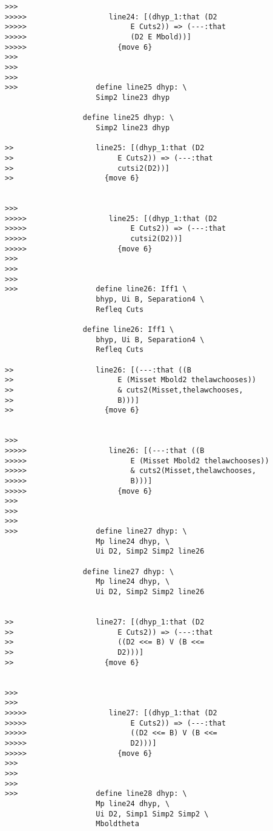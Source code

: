 \documentclass[12pt]{article}
\begin{document}
\begin{verbatim}
>>>
>>>>>                   line24: [(dhyp_1:that (D2
>>>>>                        E Cuts2)) => (---:that
>>>>>                        (D2 E Mbold))]
>>>>>                     {move 6}
>>>
>>>
>>>
>>>                  define line25 dhyp: \
                     Simp2 line23 dhyp

                  define line25 dhyp: \
                     Simp2 line23 dhyp

>>                   line25: [(dhyp_1:that (D2
>>                        E Cuts2)) => (---:that
>>                        cutsi2(D2))]
>>                     {move 6}


>>>
>>>>>                   line25: [(dhyp_1:that (D2
>>>>>                        E Cuts2)) => (---:that
>>>>>                        cutsi2(D2))]
>>>>>                     {move 6}
>>>
>>>
>>>
>>>                  define line26: Iff1 \
                     bhyp, Ui B, Separation4 \
                     Refleq Cuts

                  define line26: Iff1 \
                     bhyp, Ui B, Separation4 \
                     Refleq Cuts

>>                   line26: [(---:that ((B
>>                        E (Misset Mbold2 thelawchooses))
>>                        & cuts2(Misset,thelawchooses,
>>                        B)))]
>>                     {move 6}


>>>
>>>>>                   line26: [(---:that ((B
>>>>>                        E (Misset Mbold2 thelawchooses))
>>>>>                        & cuts2(Misset,thelawchooses,
>>>>>                        B)))]
>>>>>                     {move 6}
>>>
>>>
>>>
>>>                  define line27 dhyp: \
                     Mp line24 dhyp, \
                     Ui D2, Simp2 Simp2 line26

                  define line27 dhyp: \
                     Mp line24 dhyp, \
                     Ui D2, Simp2 Simp2 line26


>>                   line27: [(dhyp_1:that (D2
>>                        E Cuts2)) => (---:that
>>                        ((D2 <<= B) V (B <<=
>>                        D2)))]
>>                     {move 6}


>>>
>>>
>>>>>                   line27: [(dhyp_1:that (D2
>>>>>                        E Cuts2)) => (---:that
>>>>>                        ((D2 <<= B) V (B <<=
>>>>>                        D2)))]
>>>>>                     {move 6}
>>>
>>>
>>>
>>>                  define line28 dhyp: \
                     Mp line24 dhyp, \
                     Ui D2, Simp1 Simp2 Simp2 \
                     Mboldtheta


\end{verbatim}
\end{document}
